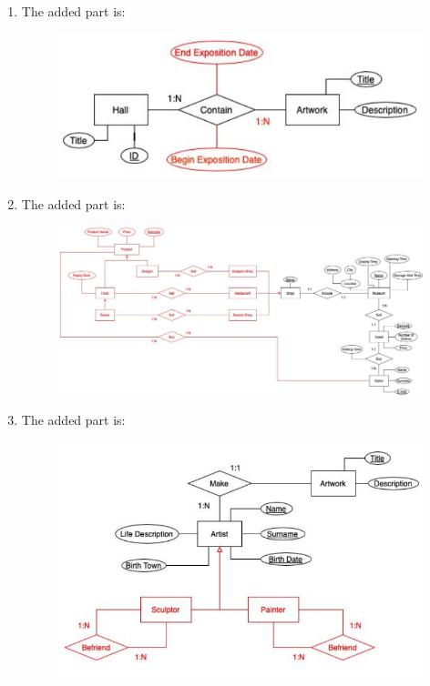 \begin{enumerate}
    \item The added part is: 
        \begin{figure}[H]
            \centering
            \includegraphics[width=0.75\linewidth]{images/er2.png}
        \end{figure}
    \item The added part is: 
        \begin{figure}[H]
            \centering
            \includegraphics[width=0.75\linewidth]{images/er3.png}
        \end{figure}
    \item The added part is: 
        \begin{figure}[H]
            \centering
            \includegraphics[width=0.75\linewidth]{images/er4.png}
        \end{figure}
\end{enumerate}

